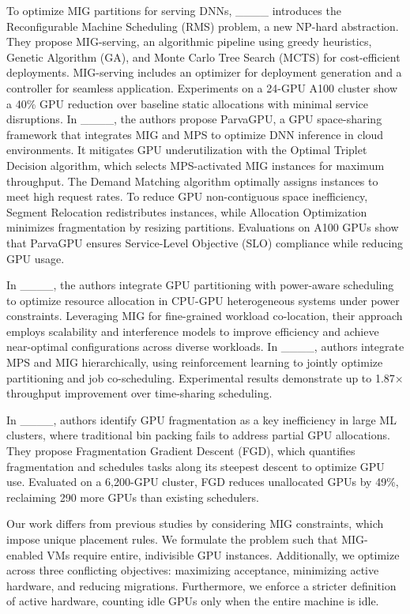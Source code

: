 	To optimize MIG partitions for serving DNNs, ____ introduces the Reconfigurable Machine Scheduling (RMS) problem, a new NP-hard abstraction. They propose MIG-serving, an algorithmic pipeline using greedy heuristics, Genetic Algorithm (GA), and Monte Carlo Tree Search (MCTS) for cost-efficient deployments. MIG-serving includes an optimizer for deployment generation and a controller for seamless application. Experiments on a 24-GPU A100 cluster show a 40\% GPU reduction over baseline static allocations with minimal service disruptions. In ____, the authors propose ParvaGPU, a GPU space-sharing framework that integrates MIG and MPS to optimize DNN inference in cloud environments. It mitigates GPU underutilization with the Optimal Triplet Decision algorithm, which selects MPS-activated MIG instances for maximum throughput. The Demand Matching algorithm optimally assigns instances to meet high request rates. To reduce GPU non-contiguous space inefficiency, Segment Relocation redistributes instances, while Allocation Optimization minimizes fragmentation by resizing partitions. Evaluations on A100 GPUs show that ParvaGPU ensures Service-Level Objective (SLO) compliance while reducing GPU usage.
	
	In ____, the authors integrate GPU partitioning with power-aware scheduling to optimize resource allocation in CPU-GPU heterogeneous systems under power constraints. Leveraging MIG for fine-grained workload co-location, their approach employs scalability and interference models to improve efficiency and achieve near-optimal configurations across diverse workloads. In ____, authors integrate MPS and MIG hierarchically, using reinforcement learning to jointly optimize partitioning and job co-scheduling. Experimental results demonstrate up to 1.87× throughput improvement over time-sharing scheduling.
	
	In ____, authors identify GPU fragmentation as a key inefficiency in large ML clusters, where traditional bin packing fails to address partial GPU allocations. They propose Fragmentation Gradient Descent (FGD), which quantifies fragmentation and schedules tasks along its steepest descent to optimize GPU use. Evaluated on a 6,200-GPU cluster, FGD reduces unallocated GPUs by 49\%, reclaiming 290 more GPUs than existing schedulers.
	
	Our work differs from previous studies by considering MIG constraints, which impose unique placement rules. We formulate the problem such that MIG-enabled VMs require entire, indivisible GPU instances. Additionally, we optimize across three conflicting objectives: maximizing acceptance, minimizing active hardware, and reducing migrations. Furthermore, we enforce a stricter definition of active hardware, counting idle GPUs only when the entire machine is idle.